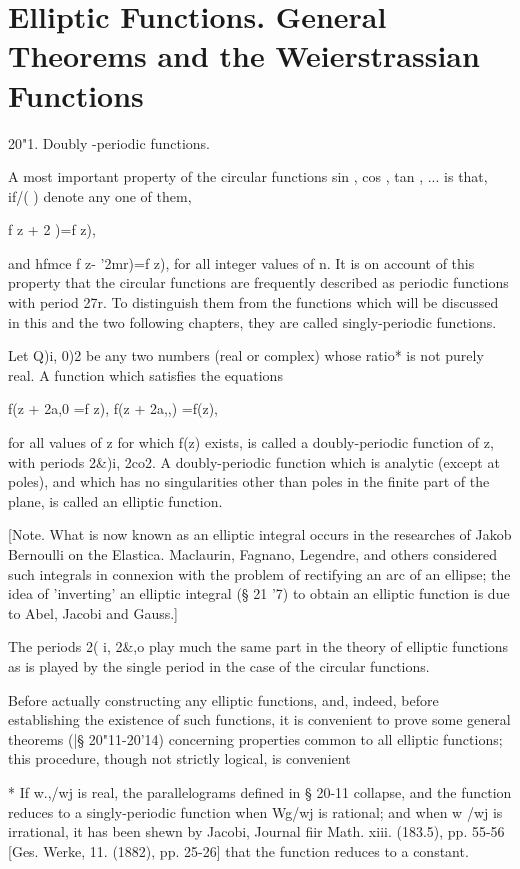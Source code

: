 \chapter{Elliptic Functions. General Theorems and the 
Weierstrassian Functions} 

20"1. Doubly -periodic functions.

A most important property of the circular functions sin , cos , tan ,
... is that, if/( ) denote any one of them,

f z + 2 )=f z),

and hfmce f z- '2mr)=f z), for all integer values of n. It is on
account of this property that the circular functions are frequently
described as periodic functions with period 27r. To distinguish them
from the functions which will be discussed in this and the two
following chapters, they are called singly-periodic functions.

Let Q)i, 0)2 be any two numbers (real or complex) whose ratio* is not
purely real. A function which satisfies the equations

f(z + 2a,0 =f z), f(z + 2a,,) =f(z),

for all values of z for which f(z) exists, is called a doubly-periodic
function of z, with periods 2\&)i, 2co2. A doubly-periodic function
which is analytic (except at poles), and which has no singularities
other than poles in the finite part of the plane, is called an
elliptic function.

[Note. What is now known as an elliptic integral occurs in the
researches of Jakob Bernoulli on the Elastica. Maclaurin, Fagnano,
Legendre, and others considered such integrals in connexion with the
problem of rectifying an arc of an ellipse; the idea of 'inverting'
an elliptic integral (§ 21 '7) to obtain an elliptic function is due
to Abel, Jacobi and Gauss.]

The periods 2( i, 2\&,o play much the same part in the theory of
elliptic functions as is played by the single period in the case of
the circular functions.

Before actually constructing any elliptic functions, and, indeed,
before establishing the existence of such functions, it is convenient
to prove some general theorems (|§ 20"11-20'14) concerning properties
common to all elliptic functions; this procedure, though not strictly
logical, is convenient

* If w.,/wj is real, the parallelograms defined in § 20-11 collapse,
and the function reduces to a singly-periodic function when Wg/wj is
rational; and when w /wj is irrational, it has been shewn by Jacobi,
Journal fiir Math. xiii. (183.5), pp. 55-56 [Ges. Werke, 11. (1882),
pp. 25-26] that the function reduces to a constant.

